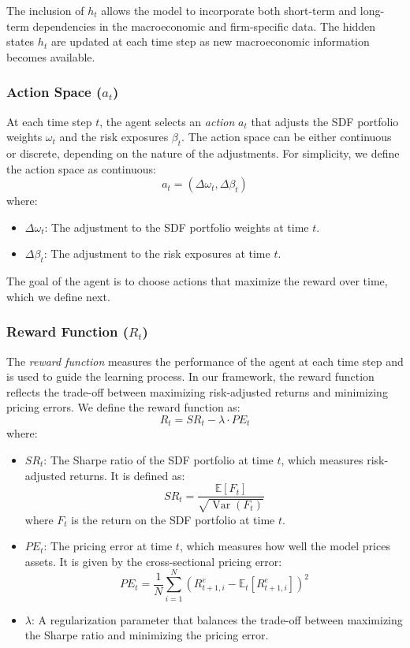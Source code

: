 The inclusion of $h_t$ allows the model to incorporate both short-term and long-term dependencies in the macroeconomic and firm-specific data. The hidden states $h_t$ are updated at each time step as new macroeconomic information becomes available.

\subsubsection{Action Space ($a_t$)}

At each time step $t$, the agent selects an \textit{action} $a_t$ that adjusts the SDF portfolio weights $\omega_t$ and the risk exposures $\beta_t$. The action space can be either continuous or discrete, depending on the nature of the adjustments. For simplicity, we define the action space as continuous:
\[
a_t = \left(\Delta \omega_t, \Delta \beta_t\right)
\]
where:
\begin{itemize}
    \item $\Delta \omega_t$: The adjustment to the SDF portfolio weights at time $t$.
    \item $\Delta \beta_t$: The adjustment to the risk exposures at time $t$.
\end{itemize}

The goal of the agent is to choose actions that maximize the reward over time, which we define next.

\subsubsection{Reward Function ($R_t$)}

The \textit{reward function} measures the performance of the agent at each time step and is used to guide the learning process. In our framework, the reward function reflects the trade-off between maximizing risk-adjusted returns and minimizing pricing errors. We define the reward function as:
\[
R_t = SR_t - \lambda \cdot PE_t
\]
where:
\begin{itemize}
    \item $SR_t$: The Sharpe ratio of the SDF portfolio at time $t$, which measures risk-adjusted returns. It is defined as:
    \[
    SR_t = \frac{\mathbb{E}[F_t]}{\sqrt{\operatorname{Var}(F_t)}}
    \]
    where $F_t$ is the return on the SDF portfolio at time $t$.
    \item $PE_t$: The pricing error at time $t$, which measures how well the model prices assets. It is given by the cross-sectional pricing error:
    \[
    PE_t = \frac{1}{N} \sum_{i=1}^N \left( R_{t+1, i}^e - \mathbb{E}_t\left[R_{t+1, i}^e \right] \right)^2
    \]
    \item $\lambda$: A regularization parameter that balances the trade-off between maximizing the Sharpe ratio and minimizing the pricing error.
\end{itemize}


